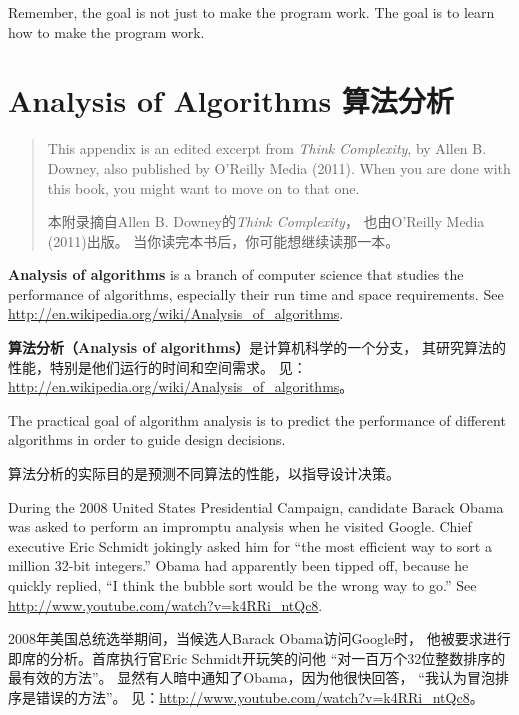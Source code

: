 \documentclass[10pt]{book}
\begin{document}
\begin{CJK}{UTF8}{gbsn}
Remember, the goal is not just to make the program
work.  The goal is to learn how to make the program work.


\chapter{Analysis of Algorithms 算法分析}

\begin{quote}
This appendix is an edited excerpt from {\it Think Complexity}, by
Allen B. Downey, also published by O'Reilly Media (2011).  When you
are done with this book, you might want to move on to that one.

本附录摘自Allen B. Downey的{\it Think Complexity}，
也由O'Reilly Media (2011)出版。
当你读完本书后，你可能想继续读那一本。
\end{quote}

{\bf Analysis of algorithms} is a branch of computer science that
studies the performance of algorithms, especially their run time and
space requirements.  See
\url{http://en.wikipedia.org/wiki/Analysis_of_algorithms}.
 

{\bf 算法分析（Analysis of algorithms）}是计算机科学的一个分支，
其研究算法的性能，特别是他们运行的时间和空间需求。
见：\url{http://en.wikipedia.org/wiki/Analysis_of_algorithms}。

The practical goal of algorithm analysis is to predict the performance
of different algorithms in order to guide design decisions.

算法分析的实际目的是预测不同算法的性能，以指导设计决策。

During the 2008 United States Presidential Campaign, candidate
Barack Obama was asked to perform an impromptu analysis when
he visited Google.  Chief executive Eric Schmidt jokingly asked him
for ``the most efficient way to sort a million 32-bit integers.''
Obama had apparently been tipped off, because he quickly
replied, ``I think the bubble sort would be the wrong way to go.''
See \url{http://www.youtube.com/watch?v=k4RRi_ntQc8}.

2008年美国总统选举期间，当候选人Barack Obama访问Google时，
他被要求进行即席的分析。首席执行官Eric Schmidt开玩笑的问他
``对一百万个32位整数排序的最有效的方法''。
显然有人暗中通知了Obama，因为他很快回答，
``我认为冒泡排序是错误的方法''。
见：\url{http://www.youtube.com/watch?v=k4RRi_ntQc8}。


\end{CJK}
\end{document}
